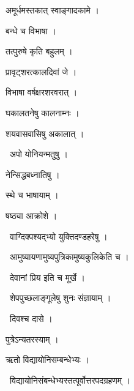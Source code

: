 \documentclass[10pt, openany, oneside]{book}
\begin{document}
\noindent अमूर्धमस्तकात् स्वाङ्गादकामे ।

\noindent बन्धे च विभाषा ।

\noindent तत्पुरुषे कृति बहुलम् ।

\noindent प्रावृट्शरत्कालदिवां जे ।

\noindent विभाषा वर्षक्षरशरवरात् ।

\noindent घकालतनेषु कालनाम्नः ।

\noindent शयवासवासिषु अकालात् ।

\par\noindent\hspace{1.5em}{\vps वा॰}~{\qt अपो योनियन्मतुषु ।}

\noindent नेन्सिद्धबध्नातिषु ।

\noindent स्थे च भाषायाम् ।

\noindent षष्ठ्या आक्रोशे ।

\par\noindent\hspace{1.5em}{\vps वा॰}~{\qt वाग्दिक्पश्यद्भ्यो युक्तिदण्डहरेषु ।}

\par\noindent\hspace{1.5em}{\vps वा॰}~{\qt आमुष्यायणामुष्यपुत्रिकामुष्यकुलिकेति च ।}

\par\noindent\hspace{1.5em}{\vps वा॰}~{\qt देवानां प्रिय इति च मूर्खे ।}

\par\noindent\hspace{1.5em}{\vps वा॰}~{\qt शेपपुच्छलाङ्गूलेषु शुनः संज्ञायाम् ।}

\par\noindent\hspace{1.5em}{\vps वा॰}~{\qt दिवश्च दासे ।}

\noindent पुत्रेऽन्यतरस्याम् ।

\noindent ऋतो विद्यायोनिसम्बन्धेभ्यः ।

\par\noindent\hspace{1.5em}{\vps वा॰}~{\qt विद्यायोनिसंबन्धेभ्यस्तत्पूर्वोत्तरपदग्रहणम् ।}
\end{document}
